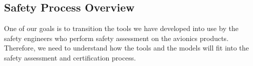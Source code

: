\subsection{Safety Process Overview}
\label{subsec:process}

One of our goals is to transition the tools we have developed into use by the safety engineers who perform safety assessment on the avionics products. Therefore, we need to understand how the tools and the models will fit into the safety assessment and certification process.

